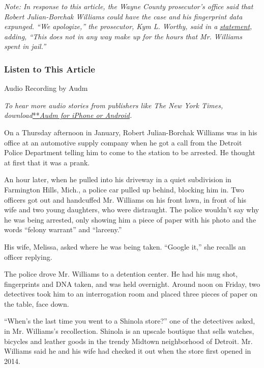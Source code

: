 \emph{Note: In response to this article, the Wayne County prosecutor's
office said that Robert Julian-Borchak Williams could have the case and
his fingerprint data expunged. ``We apologize,'' the prosecutor, Kym L.
Worthy, said in a}
\href{https://int.nyt.com/data/documenthelper/7046-facial-recognition-arrest/5a6d6d0047295fad363b/optimized/full.pdf\#page=1}{\emph{statement}}\emph{,
adding, ``This does not in any way make up for the hours that Mr.
Williams spent in jail.''}

\hypertarget{listen-to-this-article}{%
\subsubsection{Listen to This Article}\label{listen-to-this-article}}

Audio Recording by Audm

\emph{To hear more audio stories from publishers like The New York
Times,
download}\href{https://www.audm.com/?utm_source=nytmag\&utm_medium=embed\&utm_campaign=left_behind_draper}{**}\href{https://www.audm.com/?utm_source=nyt\&utm_medium=embed\&utm_campaign=wrongfully_accused_algorithm}{\emph{Audm
for iPhone or Android}}\emph{.}

On a Thursday afternoon in January, Robert Julian-Borchak Williams was
in his office at an automotive supply company when he got a call from
the Detroit Police Department telling him to come to the station to be
arrested. He thought at first that it was a prank.

An hour later, when he pulled into his driveway in a quiet subdivision
in Farmington Hills, Mich., a police car pulled up behind, blocking him
in. Two officers got out and handcuffed Mr. Williams on his front lawn,
in front of his wife and two young daughters, who were distraught. The
police wouldn't say why he was being arrested, only showing him a piece
of paper with his photo and the words ``felony warrant'' and
``larceny.''

His wife, Melissa, asked where he was being taken. ``Google it,'' she
recalls an officer replying.

The police drove Mr. Williams to a detention center. He had his mug
shot, fingerprints and DNA taken, and was held overnight. Around noon on
Friday, two detectives took him to an interrogation room and placed
three pieces of paper on the table, face down.

``When's the last time you went to a Shinola store?'' one of the
detectives asked, in Mr. Williams's recollection. Shinola is an upscale
boutique that sells watches, bicycles and leather goods in the trendy
Midtown neighborhood of Detroit. Mr. Williams said he and his wife had
checked it out when the store first opened in 2014.

